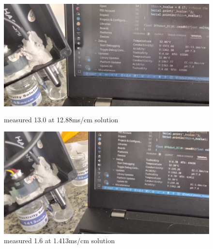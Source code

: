 \begin{figure}[h]
  \centering
  \begin{minipage}[b]{0.7\textwidth}
    \includegraphics[width=\textwidth]{sensors/21_ec1288_dfrobot.jpg}
    \caption{measured 13.0 at 12.88ms/cm solution}
  \end{minipage}
  \hfill
  \begin{minipage}[b]{0.7\textwidth}
    \includegraphics[width=\textwidth]{sensors/22_ec1413_dfrobot.jpg}
    \caption{measured 1.6 at 1.413ms/cm solution}
  \end{minipage}
\end{figure}